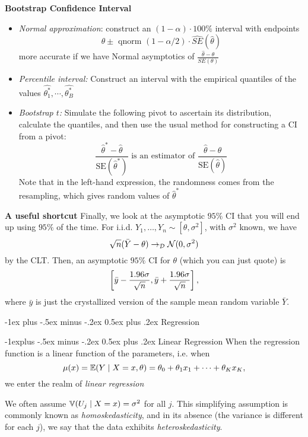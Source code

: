 \documentclass[10pt,landscape]{article}
\makeatletter
\renewcommand{\section}{\@startsection{section}{1}{0mm}%
                                {-1ex plus -.5ex minus -.2ex}%
                                {0.5ex plus .2ex}%
                                {\normalfont\large\bfseries}}
\renewcommand{\subsection}{\@startsection{subsection}{2}{0mm}%
                                {-1explus -.5ex minus -.2ex}%
                                {0.5ex plus .2ex}%
                                {\normalfont\normalsize\bfseries}}
\makeatother
\begin{document}
\begin{multicols*}{3}
\textbf{Bootstrap Confidence Interval}

\begin{itemize}
    \item \textit{Normal approximation}: construct an $(1 -\alpha) \cdot 100\%$ interval with endpoints $$\theta \pm \text{ qnorm } (1-\alpha/2)\cdot \hat{SE} (\hat{\theta}) $$
    more accurate if we have Normal asymptotics of $\frac{\hat{\theta}-\theta}{SE(\theta)}$
    \item \textit{Percentile interval: } Construct an interval with the empirical quantiles of the values $\hat{\theta_1^*} , \cdots, \hat{\theta_B^*}$
    \item \textit{Bootstrap $t$:} Simulate the following pivot to ascertain its distribution, calculate the quantiles, and then use the usual method for constructing a CI from a pivot:
    $$\frac{\hat{\theta}^* - \hat{\theta}}{\text{SE}(\hat{\theta}^*)} \text{ is an estimator of } \frac{\hat{\theta}-\theta}{\text{SE}(\hat{\theta})}$$
    Note that in the left-hand expression, the randomness comes from the resampling,
    which gives random values of $\hat{\theta}^*$
\end{itemize}

\textbf{A useful shortcut}
Finally, we look at the asymptotic $95\%$ CI that you will end up using $95\%$ of the time. For i.i.d. $Y_1,\dots,Y_n\sim [\theta,\sigma^2]$, with $\sigma^2$ known, we have $$\sqrt{n}(\bar{Y}-\theta)\to_\mathcal{D}\mathcal{N}(0,\sigma^2)$$ by the CLT. Then, an asymptotic $95\%$ CI for $\theta$ (which you can just quote) is $$\left[ \bar{y}-\frac{1.96\sigma}{\sqrt{n}},\bar{y}+\frac{1.96\sigma}{\sqrt{n}} \right],$$ where $\bar{y}$ is just the crystallized version of the sample mean random variable $\bar{Y}$.

\section{Regression}

\subsection{Linear Regression}
When the regression function is a linear function of the parameters, i.e. when $$\mu(x)=\mathbb{E} (Y\mid X=x,\theta)=\theta_0+\theta_1x_1+\cdots+\theta_K x_K,$$ we enter the realm of \emph{linear regression}

We often assume $\mathbb{V} (U_j\mid X=x)=\sigma^2$ for all $j$. This simplifying assumption is commonly known as \emph{homoskedasticity}, and in its absence (the variance is different for each $j$), we say that the data exhibits \emph{heteroskedasticity}.


\end{multicols*}
\end{document}
